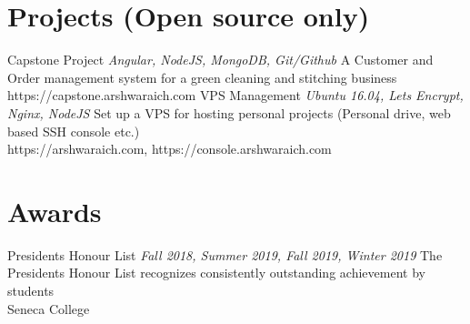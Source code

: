 \documentclass[letterpaper]{moderncv}        %
\begin{document}
\section{Projects (Open source only)}
\cventry
{}
{Capstone Project}
{}
{\textit{Angular, NodeJS, MongoDB, Git/Github}}
{}
{A Customer and Order management system for a green cleaning and stitching business\\https://capstone.arshwaraich.com}
\vspace{1mm}
\cventry
{}
{VPS Management}
{}
{\textit{Ubuntu 16.04, Let\textquotesingle{}s Encrypt, Nginx, NodeJS}}
{}
{Set up a VPS for hosting personal projects (Personal drive, web based SSH console etc.)\\https://arshwaraich.com, https://console.arshwaraich.com}
\vspace{1mm}
\section{Awards}
\cventry
{}
{President\textquotesingle{}s Honour List}
{}
{\textit{Fall 2018, Summer 2019, Fall 2019, Winter 2019}}
{}
{The President\textquotesingle{}s Honour List recognizes consistently outstanding achievement by students\\Seneca College}
\vspace{1mm}
\ 
\end{document}
